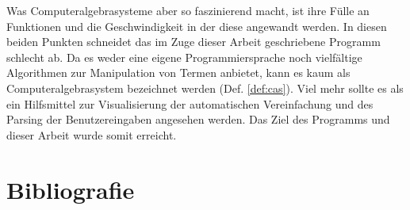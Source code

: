 \documentclass[11pt]{article}
\newcommand{\lab}[1]{(Def. \ref{#1})}
\begin{document}
Was Computeralgebrasysteme aber so faszinierend macht, ist ihre Fülle an Funktionen und die Geschwindigkeit 
in der diese angewandt werden. In diesen beiden Punkten schneidet das im Zuge dieser Arbeit
geschriebene Programm schlecht ab. Da es weder eine eigene Programmiersprache noch vielfältige Algorithmen
zur Manipulation von Termen anbietet, kann es kaum als Computeralgebrasystem bezeichnet werden \lab{def:cas}.
Viel mehr sollte es als ein Hilfsmittel zur Visualisierung der automatischen Vereinfachung und des Parsing der 
Benutzereingaben angesehen werden. Das Ziel des Programms und dieser Arbeit wurde somit erreicht.

\section{Bibliografie}
\printbibliography[heading=none]
 
\end{document}
